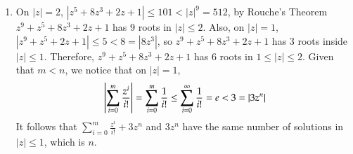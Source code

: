 \documentclass[12pt]{article}
\theoremstyle{definitionstyle}
\begin{document}
\begin{enumerate}[leftmargin=\labelsep]
\begin{align*}
		\end{align*}
		(Note: $a_{-1} = 1$). Quite a spectacular result if I do say so myself. Since we actually wanted $-\int_\gamma xdy$, we have derived the identity in the problem. Finally, using that areas are nonnegative yields:
		\begin{align*}
			0 \leq -\pi\sum_{n=-1}^\infty nr^{2n}|a_n|^2 \iff \sum_{n=-1}^\infty nr^{2n}|a_n|^2 \leq 0
		\end{align*}
		This says that
		\begin{align*}
			\sum_{n=0}^\infty nr^{2n}|a_n|^2 \leq r^{-2}
		\end{align*}
		Finally, since the limit preserves inequalities, we conclude that
		\begin{align*}
			&\; \; \lim_{r \to 1^-} \sum_{n=0}^\infty nr^{2n}|a_n|^2 \leq \lim_{r \to 1^-} r^{-2} \\
			&\implies \sum_{n=0}^\infty\lim_{r \to 1^-}nr^{2n}|a_n|^2 \leq 1 \\
			&\implies \sum_{n=0}^\infty n|a_n|^2 \leq 1
		\end{align*}
				
		\item On $|z|= 2$, $|z^5 + 8z^3 + 2z + 1| \leq 101 < |z|^9 = 512$, by Rouche's Theorem $z^9 + z^5 + 8z^3 + 2z + 1$ has 9 roots in $|z| \leq 2$. Also, on $|z| = 1$, $|z^9 + z^5 + 2z + 1| \leq 5 < 8 = |8z^3|$, so $z^9 + z^5 + 8z^3 + 2z + 1$ has 3 roots inside $|z| \leq 1$. Therefore, $z^9 + z^5 + 8z^3 + 2z + 1$ has 6 roots in $1 \leq |z| \leq 2$. Given that $m < n$, we notice that on $|z| = 1$,
		\begin{align*}
			\qty|\sum_{i=0}^m \frac{z^i}{i!}| = \sum_{i=0}^m \frac{1}{i!} \leq \sum_{i=0}^\infty \frac{1}{i!} = e < 3 = |3z^n|
		\end{align*}
		It follows that $\sum_{i=0}^m \frac{z^i}{i!} + 3z^n$ and $3z^n$ have the same number of solutions in $|z| \leq 1$, which is $n$.
		

\end{enumerate}
\end{document}
